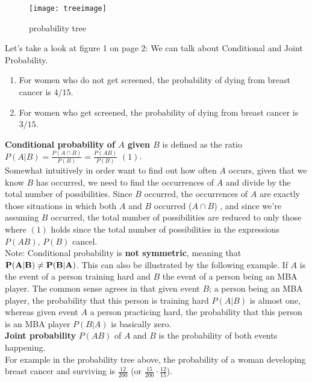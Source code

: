 \documentclass[12pt]{amsart}
\begin{document}
\begin{figure}[t]
\texttt{[image: treeimage]}
\caption{probability tree}
\end{figure}

Let's take a look at figure 1 on page 2:
We can talk about Conditional  and Joint Probability.\\
\begin{enumerate}
\item For women who do not get screened, the probability of dying from breast cancer is $4/15$.
\item For women who get screened, the probability of dying from breast cancer is  $3/15$.
\end{enumerate}

{\bf Conditional probability of $A$ given $B$} is defined as the ratio\\
$P(A|B)=\displaystyle\frac{P(A\cap B)}{P(B)}=\displaystyle\frac{P(AB)}{P(B)}$ $(1)$.\\
Somewhat intuitively in order want to find out how often $A$ occurs, given that we know $B$ has occurred, we need to find the occurrences of $A$ and divide by the total number of possibilities. Since $B$ occurred, the occurrences of $A$ are exactly those situations in which both $A$ and $B$ occurred ($A\cap B$) , and since we're assuming $B$ occurred, the total number of possibilities are reduced to only those where $(1)$ holds since the total number of possibilities in the expressions  $P(AB)$, $P(B)$ cancel.\\

Note: Conditional probability is {\bf not symmetric}, meaning that  ${\bf P(A|B)\neq P(B|A)}$. This can also be illustrated by the following example.
If $A$ is the event of a person training hard and $B$ the event of a person being an MBA player. The common sense agrees in that given event $B$; a person being an MBA player, the probability that this person is training hard $P(A|B)$ is almost one, whereas given event $A$ a person practicing hard, the probability that this person is an MBA player $P(B|A)$ is basically zero.\\
{\bf Joint probability} $P(AB)$ of $A$ and $B$ is the probability of both events happening.\\
For example in the probability tree above, the probability of a woman developing breast cancer and surviving is $\frac{12}{200}$ (or $\frac{15}{200}\cdot \frac{12}{15}$).\\
\end{document}
